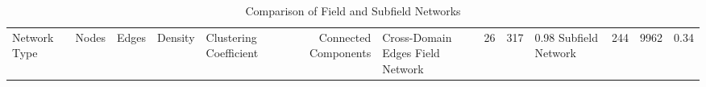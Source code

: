 \begin{table}
\caption{Comparison of Field and Subfield Networks}
\label{tab:network_comparison}
\begin{tabular}{lrrllrl}
\toprule
Network Type & Nodes & Edges & Density & Clustering Coefficient & Connected Components & Cross-Domain Edges %
\midrule
Field Network & 26 & 317 & 0.98%
Subfield Network & 244 & 9962 & 0.34%
\bottomrule
\end{tabular}
\end{table}
